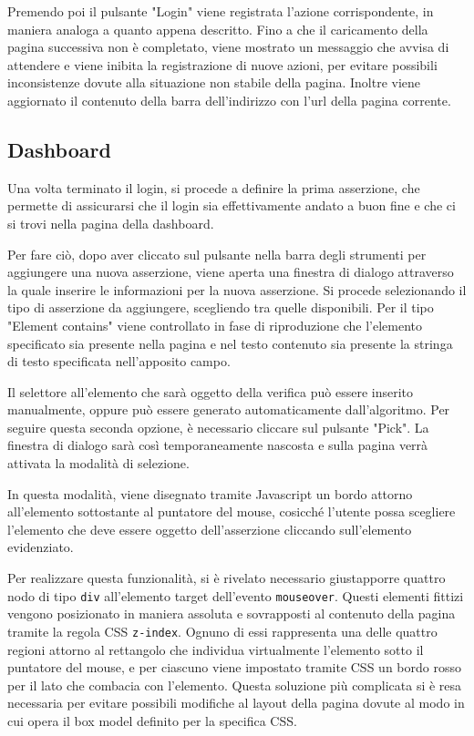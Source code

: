 Premendo poi il pulsante "Login" viene registrata l'azione corrispondente, in maniera analoga a quanto appena descritto. Fino a che il caricamento della pagina successiva non è completato, viene mostrato un messaggio che avvisa di attendere e viene inibita la registrazione di nuove azioni, per evitare possibili inconsistenze dovute alla situazione non stabile della pagina. Inoltre viene aggiornato il contenuto della barra dell'indirizzo con l'url della pagina corrente.

\subsection{Dashboard}

Una volta terminato il login, si procede a definire la prima asserzione, che permette di assicurarsi che il login sia effettivamente andato a buon fine e che ci si trovi nella pagina della dashboard. 

Per fare ciò, dopo aver cliccato sul pulsante nella barra degli strumenti per aggiungere una nuova asserzione, viene aperta una finestra di dialogo attraverso la quale inserire le informazioni per la nuova asserzione. Si procede selezionando il tipo di asserzione da aggiungere, scegliendo tra quelle disponibili. Per il tipo "Element contains" viene controllato in fase di riproduzione che l'elemento specificato sia presente nella pagina e nel testo contenuto sia presente la stringa di testo specificata nell'apposito campo.

Il selettore all'elemento che sarà oggetto della verifica può essere inserito manualmente, oppure può essere generato automaticamente dall'algoritmo. Per seguire questa seconda opzione, è necessario cliccare sul pulsante "Pick". La finestra di dialogo sarà così temporaneamente nascosta e sulla pagina verrà attivata la modalità di selezione. 

In questa modalità, viene disegnato tramite Javascript un bordo attorno all'elemento sottostante al puntatore del mouse, cosicché l'utente possa scegliere l'elemento che deve essere oggetto dell'asserzione cliccando sull'elemento evidenziato.

Per realizzare questa funzionalità, si è rivelato necessario giustapporre quattro nodo di tipo \verb|div| all'elemento target dell'evento \verb|mouseover|. Questi elementi fittizi vengono posizionato in maniera assoluta e sovrapposti al contenuto della pagina tramite la regola CSS \verb|z-index|. Ognuno di essi rappresenta una delle quattro regioni attorno al rettangolo che individua virtualmente l'elemento sotto il puntatore del mouse, e per ciascuno viene impostato tramite CSS un bordo rosso per il lato che combacia con l'elemento. Questa soluzione più complicata si è resa necessaria per evitare possibili modifiche al layout della pagina dovute al modo in cui opera il box model definito per la specifica CSS. 


